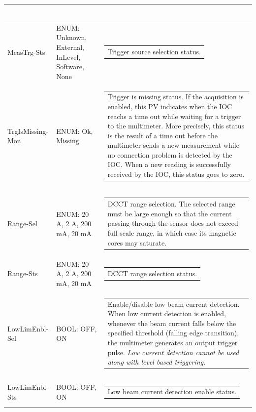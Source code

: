 \documentclass[openany]{article}
\begin{document}
\begin{longtable}{| m{3.0cm} m{4.5cm} m{7.0cm} |}
\begin{tabular}{@{}m{6cm}@{}}
					  \end{tabular} \\ \hline
		MeasTrg-Sts & ENUM: Unknown, External, InLevel, Software, None & \begin{tabular}{@{}m{6cm}@{}}
	    					Trigger source selection status.
						\end{tabular} \\ \hline
		TrgIsMissing-Mon & ENUM: Ok, Missing & \begin{tabular}{@{}m{6cm}@{}}
				      	  Trigger is missing status. If the acquisition is enabled, this PV indicates when the IOC reachs a time out while waiting for a trigger to the multimeter. More precisely, this status is the result of a time out before the multimeter sends a new measurement while no connection problem is detected by the IOC. When a new reading is successfully received by the IOC, this status goes to zero.
					  \end{tabular} \\ \hline
		Range-Sel & ENUM: 20 A, 2 A, 200 mA, 20 mA & \begin{tabular}{@{}m{6cm}@{}}
	    					DCCT range selection. The selected range must be large enough so that the current passing through the sensor does not exceed full scale range, in which case its magnetic cores may saturate.
						\end{tabular} \\ \hline
		Range-Sts & ENUM: 20 A, 2 A, 200 mA, 20 mA & \begin{tabular}{@{}m{6cm}@{}}
	    					DCCT range selection status.
						\end{tabular} \\ \hline
		LowLimEnbl-Sel & BOOL: OFF, ON & \begin{tabular}{@{}m{6cm}@{}}
	    					Enable/disable low beam current detection. When low current detection is enabled, whenever the beam current falls below the specified threshold (falling edge transition), the multimeter generates an output trigger pulse. \emph{Low current detection cannot be used along with level based triggering}.
						\end{tabular} \\ \hline
		LowLimEnbl-Sts & BOOL: OFF, ON & \begin{tabular}{@{}m{6cm}@{}}
	    					Low beam current detection enable status.
						\end{tabular} \\ \hline

\end{longtable}
\end{document}
